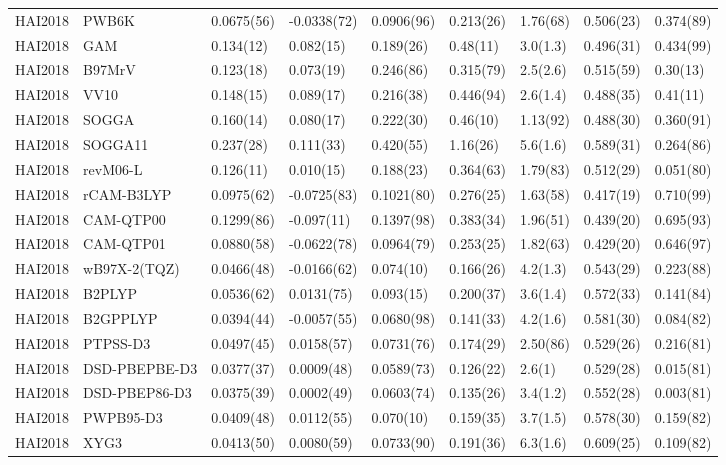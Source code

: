 \begin{table}[ht]
\begin{tabular}{lllllllll}
  HAI2018 & PWB6K & 0.0675(56) & -0.0338(72) & 0.0906(96) & 0.213(26) & 1.76(68) & 0.506(23) & 0.374(89) \\ 
  HAI2018 & GAM & 0.134(12) & 0.082(15) & 0.189(26) & 0.48(11) & 3.0(1.3) & 0.496(31) & 0.434(99) \\ 
  HAI2018 & B97MrV & 0.123(18) & 0.073(19) & 0.246(86) & 0.315(79) & 2.5(2.6) & 0.515(59) & 0.30(13) \\ 
  HAI2018 & VV10 & 0.148(15) & 0.089(17) & 0.216(38) & 0.446(94) & 2.6(1.4) & 0.488(35) & 0.41(11) \\ 
  HAI2018 & SOGGA & 0.160(14) & 0.080(17) & 0.222(30) & 0.46(10) & 1.13(92) & 0.488(30) & 0.360(91) \\ 
  HAI2018 & SOGGA11 & 0.237(28) & 0.111(33) & 0.420(55) & 1.16(26) & 5.6(1.6) & 0.589(31) & 0.264(86) \\ 
  HAI2018 & revM06-L & 0.126(11) & 0.010(15) & 0.188(23) & 0.364(63) & 1.79(83) & 0.512(29) & 0.051(80) \\ 
  HAI2018 & rCAM-B3LYP & 0.0975(62) & -0.0725(83) & 0.1021(80) & 0.276(25) & 1.63(58) & 0.417(19) & 0.710(99) \\ 
  HAI2018 & CAM-QTP00 & 0.1299(86) & -0.097(11) & 0.1397(98) & 0.383(34) & 1.96(51) & 0.439(20) & 0.695(93) \\ 
  HAI2018 & CAM-QTP01 & 0.0880(58) & -0.0622(78) & 0.0964(79) & 0.253(25) & 1.82(63) & 0.429(20) & 0.646(97) \\ 
  HAI2018 & wB97X-2(TQZ) & 0.0466(48) & -0.0166(62) & 0.074(10) & 0.166(26) & 4.2(1.3) & 0.543(29) & 0.223(88) \\ 
  HAI2018 & B2PLYP & 0.0536(62) & 0.0131(75) & 0.093(15) & 0.200(37) & 3.6(1.4) & 0.572(33) & 0.141(84) \\ 
  HAI2018 & B2GPPLYP & 0.0394(44) & -0.0057(55) & 0.0680(98) & 0.141(33) & 4.2(1.6) & 0.581(30) & 0.084(82) \\ 
  HAI2018 & PTPSS-D3 & 0.0497(45) & 0.0158(57) & 0.0731(76) & 0.174(29) & 2.50(86) & 0.529(26) & 0.216(81) \\ 
  HAI2018 & DSD-PBEPBE-D3 & 0.0377(37) & 0.0009(48) & 0.0589(73) & 0.126(22) & 2.6(1) & 0.529(28) & 0.015(81) \\ 
  HAI2018 & DSD-PBEP86-D3 & 0.0375(39) & 0.0002(49) & 0.0603(74) & 0.135(26) & 3.4(1.2) & 0.552(28) & 0.003(81) \\ 
  HAI2018 & PWPB95-D3 & 0.0409(48) & 0.0112(55) & 0.070(10) & 0.159(35) & 3.7(1.5) & 0.578(30) & 0.159(82) \\ 
  HAI2018 & XYG3 & 0.0413(50) & 0.0080(59) & 0.0733(90) & 0.191(36) & 6.3(1.6) & 0.609(25) & 0.109(82) \\ 

\end{tabular}
\end{table}
